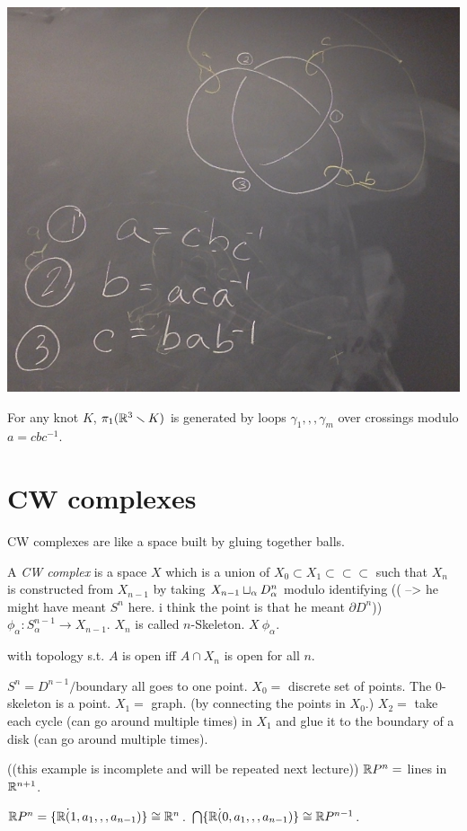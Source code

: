 \documentclass[11pt,leqno,oneside]{amsart}
\numberwithin{thm}{section}
\newcommand{\minus}{\smallsetminus}
\renewcommand{\d}{\partial}
\newcommand{\fund}{\pi_1}
\newcommand{\de}{\emph}
\begin{document}
\begin{example}
  \includegraphics[scale=0.2]{images/trefoil-fully-described.jpg}
\end{example}
\begin{thm}[Wirtinger]
  For any knot $K$, $\fund(\R^3\minus K)$ is generated by loops $\gamma_1,,,\gamma_m$ over crossings modulo $a = cbc^{-1}$.
\end{thm}


\section{CW complexes}

CW complexes are like a space built by gluing together balls.
\begin{defn}
  A \de{CW complex} is a space $X$ which is a union of $X_0 \subset X_1 \subset \subset \subset$ such that $X_n$ is constructed from $X_{n-1}$ by taking $X_{n-1} \sqcup_{\alpha} D_{\alpha}^n$ modulo identifying (( --> he might have meant $S^n$ here.  i think the point is that he meant $\d D^n$)) $\phi_\alpha \colon S_\alpha^{n-1} \to X_{n-1}$.  $X_n$ is called $n$-Skeleton.  $X ~ \phi_\alpha$.

  with topology s.t. $A$ is open iff $A \cap X_n$ is open for all $n$.
\end{defn}
\begin{example}
  $S^n = D^{n-1}/\text{boundary}$ all goes to one point.
  $X_0 =$ discrete set of points.  The $0$-skeleton is a point.
  $X_1 =$ graph. (by connecting the points in $X_0$.)
  $X_2 =$ take each cycle (can go around multiple times) in $X_1$ and glue it to the boundary of a disk (can go around multiple times).
\end{example}
\begin{example}
  ((this example is incomplete and will be repeated next lecture))
  ${\mathbb R} P^n =$ lines in ${\mathbb R}^{n+1}$.

  ${\mathbb R} P^n = \{ {\mathbb R} \dot (1, a_1,,, a_{n-1})\} \mathrel{\cong} {\mathbb R}^{n}$.
  $\bigcap \{ {\mathbb R} \dot (0, a_1,,, a_{n-1})\} \mathrel{\cong} {\mathbb R} P^{n-1}$.
\end{example}
\end{document}

